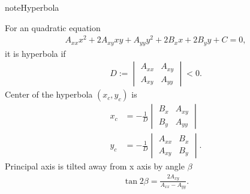 \documentclass[letterpaper,12pt,english]{sphinxmanual}
\begin{document}
\begin{sphinxadmonition}{note}{Hyperbola}

For an quadratic equation \label{\detokenize{collective/dispersion-relation:id1}}{\hyperref[\detokenize{collective/dispersion-relation:hyperbolawikipedia}]{\sphinxcrossref{{[}HyperbolaWikipedia{]}}}}
\begin{equation*}
\begin{split}A_{xx} x^2 + 2 A_{xy} xy + A_{yy} y^2 + 2 B_x x + 2 B_y y + C = 0,\end{split}
\end{equation*}
it is hyperbola if
\begin{equation*}
\begin{split}D := \begin{vmatrix} A_{xx} & A_{xy}\\A_{xy} & A_{yy} \end{vmatrix} < 0.\end{split}
\end{equation*}
Center of the hyperbola \((x_c,y_c)\) is
\begin{equation*}
\begin{split}x_c &= -\frac{1}{D} \begin{vmatrix} B_x & A_{xy} \\ B_y & A_{yy} \end{vmatrix}\\
y_c &= -\frac 1 D \begin{vmatrix} A_{xx} & B_x \\A_{xy} & B_y \end{vmatrix}.\end{split}
\end{equation*}
Principal axis is tilted away from x axis by angle \(\beta\)
\begin{equation*}
\begin{split}\tan 2\beta = \frac{2A_{xy}}{A_{xx}-A_{yy}}.\end{split}
\end{equation*}\end{sphinxadmonition}
\end{document}

